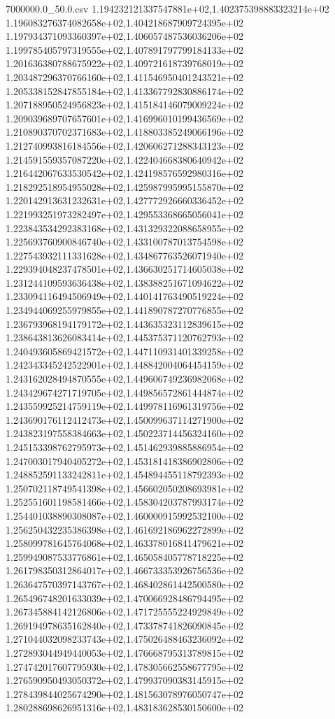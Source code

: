 \begin{filecontents*}{7000000.0_50.0.csv}
1.194232121337547881e+02,1.402375398883323214e+02
1.196083276374082658e+02,1.404218687909724395e+02
1.197934371093360397e+02,1.406057487536036206e+02
1.199785405797319555e+02,1.407891797799184133e+02
1.201636380788675922e+02,1.409721618739768019e+02
1.203487296370766160e+02,1.411546950401243521e+02
1.205338152847855184e+02,1.413367792830886174e+02
1.207188950524956823e+02,1.415184146079009224e+02
1.209039689707657601e+02,1.416996010199436569e+02
1.210890370702371683e+02,1.418803385249066196e+02
1.212740993816184556e+02,1.420606271288343123e+02
1.214591559357087220e+02,1.422404668380640942e+02
1.216442067633530542e+02,1.424198576592980316e+02
1.218292518954955028e+02,1.425987995995155870e+02
1.220142913631232631e+02,1.427772926660336452e+02
1.221993251973282497e+02,1.429553368665056041e+02
1.223843534292383168e+02,1.431329322088658955e+02
1.225693760900846740e+02,1.433100787013754598e+02
1.227543932111331628e+02,1.434867763526071940e+02
1.229394048237478501e+02,1.436630251714605038e+02
1.231244109593636438e+02,1.438388251671094622e+02
1.233094116494506949e+02,1.440141763490519224e+02
1.234944069255979855e+02,1.441890787270776855e+02
1.236793968194179172e+02,1.443635323112839615e+02
1.238643813626083414e+02,1.445375371120762793e+02
1.240493605869421572e+02,1.447110931401339258e+02
1.242343345242522901e+02,1.448842004064454159e+02
1.243162028494870555e+02,1.449606749236982068e+02
1.243429674271719705e+02,1.449856572861444874e+02
1.243559925214759119e+02,1.449978116961319756e+02
1.243690176112412473e+02,1.450099637114271900e+02
1.243823197558384663e+02,1.450223714456324160e+02
1.245153398762795973e+02,1.451462939885886954e+02
1.247003017940405272e+02,1.453181418386902806e+02
1.248852591133242811e+02,1.454894455118792393e+02
1.250702118749541398e+02,1.456602050208693981e+02
1.252551601198581466e+02,1.458304203787993174e+02
1.254401038890308087e+02,1.460000915992532100e+02
1.256250432235386398e+02,1.461692186962272899e+02
1.258099781645764068e+02,1.463378016841479621e+02
1.259949087533776861e+02,1.465058405778718225e+02
1.261798350312864017e+02,1.466733353926756536e+02
1.263647570397143767e+02,1.468402861442500580e+02
1.265496748201633039e+02,1.470066928486794495e+02
1.267345884142126806e+02,1.471725555224929849e+02
1.269194978635162840e+02,1.473378741826090845e+02
1.271044032098233743e+02,1.475026488463236092e+02
1.272893044949440053e+02,1.476668795313789815e+02
1.274742017607795930e+02,1.478305662558677795e+02
1.276590950493050372e+02,1.479937090383145915e+02
1.278439844025674290e+02,1.481563078976050747e+02
1.280288698626951316e+02,1.483183628530150600e+02

\end{filecontents*}
